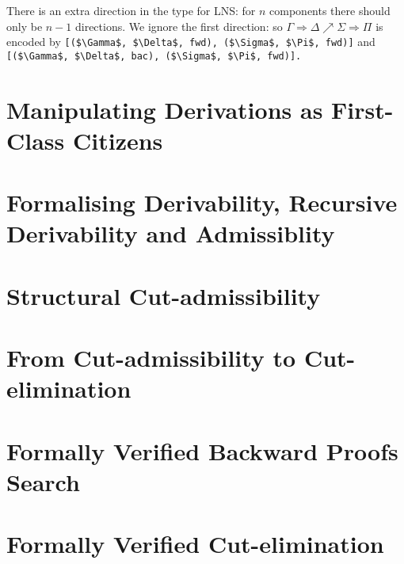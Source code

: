 \documentclass[a4paper]{article}
\newcommand{\code}{\lstinline[mathescape=true,breaklines=true,basicstyle=\ttfamily\footnotesize]}
\newcommand{\sa}{\Rightarrow}
\newcommand{\fwd}{\nearrow}
\begin{document}



There is an extra direction in the type for LNS: for $n$ components there should only be $n-1$
directions. We ignore the first direction: so $\Gamma \sa \Delta \fwd \Sigma \sa \Pi$
is encoded by 
\code|[($\Gamma$, $\Delta$, fwd), ($\Sigma$, $\Pi$, fwd)]|
and
\code|[($\Gamma$, $\Delta$, bac), ($\Sigma$, $\Pi$, fwd)].|


\section{Manipulating Derivations as First-Class Citizens}

\section{Formalising Derivability, Recursive Derivability and Admissiblity}

\section{Structural Cut-admissibility}

\section{From Cut-admissibility to Cut-elimination}

\section{Formally Verified Backward Proofs Search}

\section{Formally Verified Cut-elimination}
\end{document}

